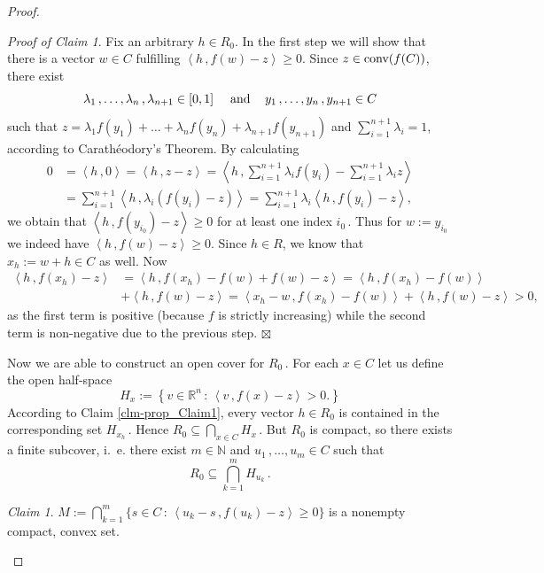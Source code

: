 \documentclass[12pt]{amsart}
\theoremstyle{remark}
\newtheorem{claim}{Claim}
\newtheorem{prclm}{Proof of Claim}[section]
\theoremstyle{definition}
\newcommand{\NN}{\mathbb{N}}
\newcommand{\Rn}{\mathbb{R}^n}
\newcommand{\conv}{\mbox{\rm conv}}
\newcommand{\bsz}[2]{\left \langle #1 \,, #2 \right \rangle}
\begin{document}
\begin{proof}
\begin{prclm}
Fix an arbitrary $ h \in R_0 $. In the first step 
we will show that there is a vector $ w \in C $ fulfilling 
$ \bsz{h}{f(w)-z} \geq 0 $. Since $ z \in \conv (f(C)) $, 
there exist 
\[
\lambda_1 \,, \dots , \lambda_n \,, \lambda_{n+1} 
\in \left[ 0,1 \right] 
\hspace{3mm} \mbox{ and } \hspace{3mm} 
y_1 \,, \dots , y_n \,, y_{n+1} \in C 
\]
such that 
$ z = \lambda_1 f(y_1) + \dots + \lambda_n f(y_n) 
+ \lambda_{n+1} f(y_{n+1}) $ and 
$ \sum_{i=1}^{n+1} \lambda_i = 1 $, according to 
Carathéodory's Theorem. By calculating 
\begin{align*}
0 & = \bsz{h}{0} = \bsz{h}{z-z} 
= \bsz{h}{\sum_{i=1}^{n+1} \lambda_i f(y_i) 
- \sum_{i=1}^{n+1} \lambda_i z} \\ 
& = \sum_{i=1}^{n+1} \bsz{h}{\lambda_i \left( f(y_i)-z \right)} 
= \sum_{i=1}^{n+1} \lambda_i \bsz{h}{f(y_i)-z}, 
\end{align*} 
we obtain that $ \bsz{h}{ f(y_{i_0})-z } \geq 0 $ 
for at least one index $ i_0 \,$. Thus for $ w := y_{i_0} $ 
we indeed have $ \bsz{h}{f(w)-z} \geq 0 $. 
Since $ h \in R $, we know that $ x_h := w+h \in C $ as well. 
Now 
\begin{align*}
\bsz{h}{f(x_h) - z} & = 
\bsz{h}{f(x_h)-f(w)+f(w)-z} = 
\bsz{h}{f(x_h)-f(w)} \\ 
& +  
\bsz{h}{f(w)-z} 
= \bsz{x_h-w}{f(x_h)-f(w)} + \bsz{h}{f(w)-z} > 0, 
\end{align*} 
as the first term is positive (because $ f $ 
is strictly increasing) while the second term is non-negative 
due to the previous step. 
\flushright 
$ \boxtimes $ 
\end{prclm}
Now we are able to construct an open cover for $ R_0 \,$. 
For each $ x \in C $ let us define the open 
half-space 
\[ 
H_x := \left \lbrace 
v \in \Rn \, : \, \bsz{v}{f(x)-z} > 0. 
\right \rbrace
\]
According to Claim \ref{clm-prop_Claim1}, 
every vector $ h \in R_0 $ is contained in the corresponding 
set $ H_{x_h} \,$. Hence 
$ R_0 \subseteq \bigcap_{x \in C} H_x \,$. 
But $ R_0 $ is compact, so there exists a finite subcover, 
i.~e. there exist $ m \in  \NN $ and 
$ u_1 \,, \dots , u_m \in C $ such that 
\[
R_0 \subseteq \bigcap_{k = 1}^{m} H_{u_k} \,. 
\]
\begin{claim}\label{clm-prop_Claim2}
$ M:= \bigcap_{k=1}^{m} 
\lbrace s \in C \, : \, 
\bsz{u_k-s}{f(u_k)-z} \geq 0 
\rbrace $ 
is a nonempty compact, convex set. 
\end{claim}

\end{proof}
\end{document}
